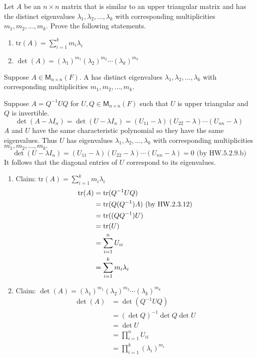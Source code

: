 Let $A$ be an $n \times n$ matrix that is similar to an upper
triangular matrix and has the distinct eigenvalues
$\lambda_1,\lambda_2,\dotsc,\lambda_k$ with corresponding
multiplicities $m_1,m_2,\dotsc,m_k.$ Prove the following statements.
\begin{enumerate}
\item $\text{tr}(A) = \sum\limits_{i=1}^k m_i\lambda_i$
\item $\det{(A)} =
  (\lambda_1)^{m_1}(\lambda_2)^{m_2}\dotsb(\lambda_k)^{m_k}$
\end{enumerate}
Suppose $A\in \mathsf{M}_{n\times n}(F).$ A has
distinct eigenvalues $\lambda_1,\lambda_2,\dotsc,\lambda_k$ with
corresponding multiplicities $m_1,m_2,\dotsc,m_k$. 

Suppose $A=Q^{-1}UQ$ for $U,Q \in \mathsf{M}_{n\times n}(F)$ such that
$U$ is upper triangular and $Q$ is invertible.
\begin{equation}
\det{(A-\lambda I_n)} = \det{(U -\lambda I_n)} =
(U_{11}-\lambda)(U_{22} -\lambda)\dotsb(U_{nn}-\lambda)
\end{equation}
$A$ and $U$ have the same characteristic polynomial so they have the
same eigenvalues. Thus $U$ has eigenvalues
$\lambda_1,\lambda_2,\dotsc,\lambda_k$ with corresponding
multiplicities $m_1,m_2,\dotsc,m_k.$
\begin{equation}
\det{(U -\lambda I_n)} = (U_{11}-\lambda)(U_{22}
-\lambda)\dotsb(U_{nn}-\lambda)= 0 \text{ (by HW.5.2.9.b)}
\end{equation}
It follows that the diagonal entries of $U$ correspond to its eigenvalues.
\begin{enumerate}
\item Claim: $\text{tr}(A) = \sum\limits_{i=1}^k m_i\lambda_i$
\begin{align}
\text{tr}({A}) &= \text{tr}({Q^{-1}UQ}) \\
&= \text{tr}({Q(Q^{-1})A}) \text{ (by HW.2.3.12)}\\
&= \text{tr}({(QQ^{-1})U})\\
&=\text{tr}({U})\\
&= \sum\limits_{i=1}^n U_{ii}\\
&= \sum\limits_{i=1}^k m_i\lambda_i
\end{align}
\item Claim: $\det{(A)} =
  (\lambda_1)^{m_1}(\lambda_2)^{m_2}\dotsb(\lambda_k)^{m_k}$
\begin{align}
\det{(A)} &= \det{(Q^{-1}UQ)}\\
&= (\det{Q})^{-1}\det{Q}\det{U}\\
&= \det{U}\\
&= \prod\limits^n_{i=1} U_{ii}\\
&= \prod\limits^k_{i=1} (\lambda_i)^{m_i}
\end{align}
\end{enumerate}
